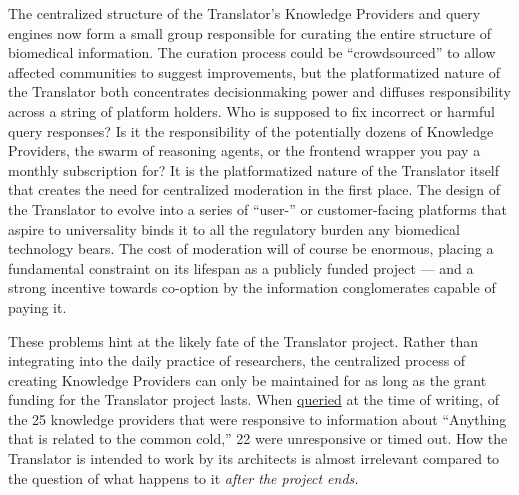 The centralized structure of the Translator's Knowledge Providers and
query engines now form a small group responsible for curating the entire
structure of biomedical information. The curation process could be
``crowdsourced'' to allow affected communities to suggest improvements,
but the platformatized nature of the Translator both concentrates
decisionmaking power and diffuses responsibility across a string of
platform holders. Who is supposed to fix incorrect or harmful query
responses? Is it the responsibility of the potentially dozens of
Knowledge Providers, the swarm of reasoning agents, or the frontend
wrapper you pay a monthly subscription for? It is the platformatized
nature of the Translator itself that creates the need for centralized
moderation in the first place. The design of the Translator to evolve
into a series of ``user-'' or customer-facing platforms that aspire to
universality binds it to all the regulatory burden any biomedical
technology bears. The cost of moderation will of course be enormous,
placing a fundamental constraint on its lifespan as a publicly funded
project --- and a strong incentive towards co-option by the information
conglomerates capable of paying it.

These problems hint at the likely fate of the Translator project. Rather
than integrating into the daily practice of researchers, the centralized
process of creating Knowledge Providers can only be maintained for as
long as the grant funding for the Translator project lasts. When
\href{https://arax.rtx.ai}{queried} at the time of writing, of the 25
knowledge providers that were responsive to information about ``Anything
that is related to the common cold,'' 22 were unresponsive or timed out.
How the Translator is intended to work by its architects is almost
irrelevant compared to the question of what happens to it \emph{after
the project ends.}

